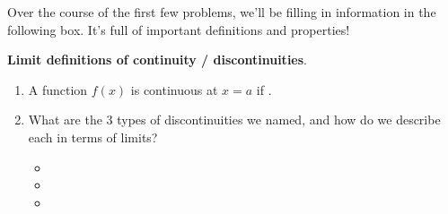 \documentclass[main]{subfiles}
\providecommand{\solonly}[1]{}
\providecommand{\fitb}[3][\ ]{\underline{\hspace{#2}}}
\begin{document}
Over the course of the first few problems, we'll be filling in information in the following box. It's full of important definitions and properties!
\begin{framed}
  \textbf{Limit definitions of continuity / discontinuities}.
  \begin{enumerate}
  \item A function $f(x)$ is continuous at $x = a$ if 
  \fitb{3in}{$\lim\limits_{x \to a} f(x)$ exists and is equal to $f(a)$}.
  \item What are the 3 types of discontinuities we named, and how do we describe each in terms of limits?
    \begin{itemize}[topsep=0pt]
    \item \medskip \solonly{A removable discontinuity aka hole occurs when 
    $\lim\limits_{x \to a} f(x)$ exists but is not equal to $f(a)$.}
    \item \medskip \solonly{A jump discontinuity occurs when 
    $\lim\limits_{x \to a} f(x)$ does not exist, but both one-sided limits exist.}
    \item \medskip \solonly{An infinite discontinuity aka vertical asymptote occurs when 
    at least one one-sided limit is $\pm\infty$.}
    \end{itemize}    
  \end{enumerate}
\end{framed}
\end{document}
